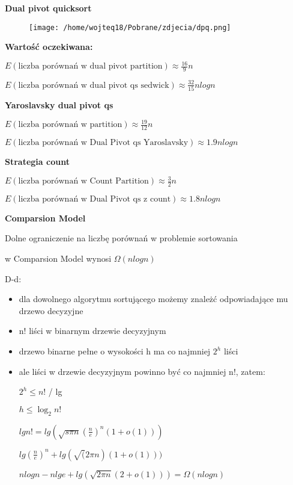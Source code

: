 \documentclass{article}
\begin{document}
    \textbf{Dual pivot quicksort} \newline

    \begin{figure}[H]
        \centering
        \texttt{[image: /home/wojteq18/Pobrane/zdjecia/dpq.png]}
        \label{fig:example_image}
    \end{figure}

    \textbf{Wartość oczekiwana: } 

    $E(\mbox{liczba porównań w dual pivot partition}) \approx \frac{16}{9}n$ 

    $E(\mbox{liczba porównań w dual pivot qs sedwick}) \approx \frac{32}{15}n logn$  \newline


    \textbf{Yaroslavsky dual pivot qs} 

    $E(\mbox{liczba porównań w partition}) \approx \frac{19}{12}n$ 

    $E(\mbox{liczba porównań w Dual Pivot qs Yaroslavsky}) \approx 1.9 n logn$ \newline

    \textbf{Strategia count}

    $E(\mbox{liczba porównań w Count Partition}) \approx \frac{3}{2}n$

    $E(\mbox{liczba porównań w Dual Pivot qs z count}) \approx 1.8 n logn$ \newline

    \textbf{Comparsion Model} 

    Dolne ograniczenie na liczbę porównań w problemie sortowania \par
    w Comparsion Model wynosi $\Omega(n logn)$ \newline

    D-d: \par
    \begin{itemize}
        \item dla dowolnego algorytmu sortującego możemy znależć odpowiadające mu drzewo decyzyjne
        \item n! liści w binarnym drzewie decyzyjnym
        \item drzewo binarne pełne o wysokości h ma co najmniej $2^h$ liści
        \item ale liści w drzewie decyzyjnym powinno być co najmniej n!, zatem: \par
        $2^h \leq n!$ / lg \par
        $h \leq \log_{2}n!$ \par
        $lg n! = lg(\sqrt{s \pi n} (\frac{n}{e})^n (1 + o(1)))$ \par
        $lg (\frac{n}{e})^n + lg (\sqrt(2 \pi n)(1 + o(1)))$ \par
        $n logn - n lg e + lg(\sqrt{2 \pi n} (2 + o(1))) = \Omega(n logn)$
    \end{itemize}    \par
\end{document}
